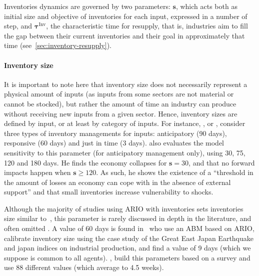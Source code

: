 Inventories dynamics are governed by two parameters: $\bm{s}$, which acts both
as initial size and objective of inventories for each input, expressed in a
number of step, and $\bm{\tau}^{\textrm{Inv}}$, the characteristic time for resupply,
that is, industries aim to fill the gap between their current inventories and
their goal in approximately that time (see~\cref{sec:inventory-resupply}).

\paragraph{Inventory size}
\label{sec:inventory-size}

It is important to note here that inventory size does not necessarily represent
a physical amount of inputs (as inputs from some sectors are not material or
cannot be stocked), but rather the amount of time an industry can produce
without receiving new inputs from a given sector. Hence, inventory sizes are
defined by input, or at least by category of inputs. For instance,
\textcite{hallegatte-2013-model-role}, or
\textcite{okuyama-2004-model-spatial}, consider three types of
inventory managements for inputs: anticipatory (90 days), responsive (60 days)
and just in time (3 days). \Textcite{hallegatte-2013-model-role}
also evaluates the model sensitivity to this parameter (for anticipatory
management only), using 30, 75, 120 and 180 days. He finds the economy
collapses for $\bm{s}=30$, and that no forward impacts happen when $\bm{s} \geq
120$. As such, he shows the existence of a ``threshold in the amount of losses
an economy can cope with in the absence of external support'' and that small
inventories increase vulnerability to shocks.

Although the majority of studies using ARIO with inventories sets inventories
size similar to~\textcite{hallegatte-2013-model-role}, this parameter
is rarely discussed in depth in the literature, and often omitted
\parencite{zhang-2021-analy-impac, zhang-2017-asses-rippl, wang-2020-econom-footp, huang-2022-estim-poten}. A value of 60 days is found in~\textcite{avelino-2019-chall-estim}
\Textcite{inoue-2018-firm-simul} who use an \acrshort{ABM}
based on ARIO, calibrate inventory size using the case study of the Great East
Japan Earthquake and japan indices on industrial production, and find a value of
9 days (which we suppose is common to all agents). \Textcite{colon-2020-fragm-produc, colon-2019-trans-suppl}, build this parameters based on a survey
and use 88 different values (which average to 4.5 weeks).


